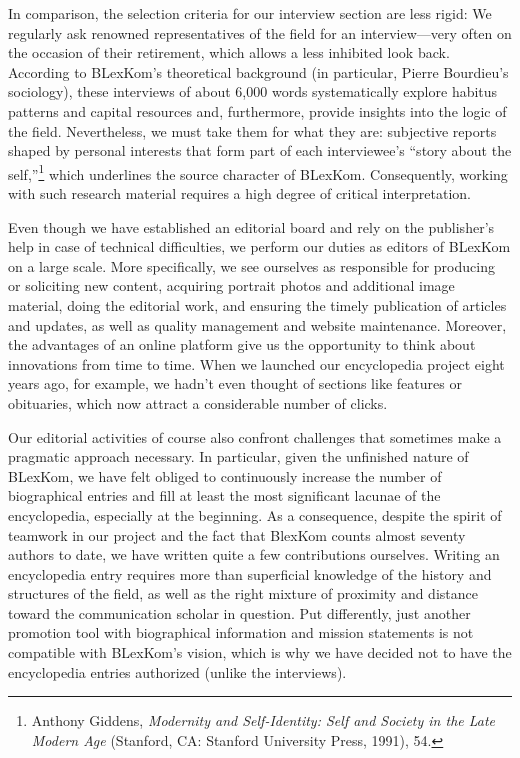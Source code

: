 \documentclass{tufte-handout}
\begin{document}
In comparison, the selection criteria for our interview section are less
rigid: We regularly ask renowned representatives of the field for an
interview---very often on the occasion of their retirement, which allows
a less inhibited look back. According to BLexKom's theoretical
background (in particular, Pierre Bourdieu's sociology), these
interviews of about 6,000 words systematically explore habitus patterns
and capital resources and, furthermore, provide insights into the logic
of the field. Nevertheless, we must take them for what they are:
subjective reports shaped by personal interests that form part of each
interviewee's ``story about the
self,''\footnote{Anthony Giddens, \emph{Modernity and Self-Identity: Self and Society
  in the Late Modern Age} (Stanford, CA: Stanford University Press,
  1991), 54.
} which underlines the
source character of BLexKom. Consequently, working with such research
material requires a high degree of critical interpretation.

Even though we have established an editorial board and rely on the
publisher's help in case of technical difficulties, we perform our
duties as editors of BLexKom on a large scale. More specifically, we see
ourselves as responsible for producing or soliciting new content,
acquiring portrait photos and additional image material, doing the
editorial work, and ensuring the timely publication of articles and
updates, as well as quality management and website maintenance.
Moreover, the advantages of an online platform give us the opportunity
to think about innovations from time to time. When we launched our
encyclopedia project eight years ago, for example, we hadn't even
thought of sections like features or obituaries, which now attract a
considerable number of clicks.

Our editorial activities of course also confront challenges that
sometimes make a pragmatic approach necessary. In particular, given the
unfinished nature of BLexKom, we have felt obliged to continuously
increase the number of biographical entries and fill at least the most
significant lacunae of the encyclopedia, especially at the beginning. As
a consequence, despite the spirit of teamwork in our project and the
fact that BlexKom counts almost seventy authors to date, we have written
quite a few contributions ourselves. Writing an encyclopedia entry
requires more than superficial knowledge of the history and structures
of the field, as well as the right mixture of proximity and distance
toward the communication scholar in question. Put differently, just
another promotion tool with biographical information and mission
statements is not compatible with BLexKom's vision, which is why we have
decided not to have the encyclopedia entries authorized (unlike the
interviews).
\end{document}
